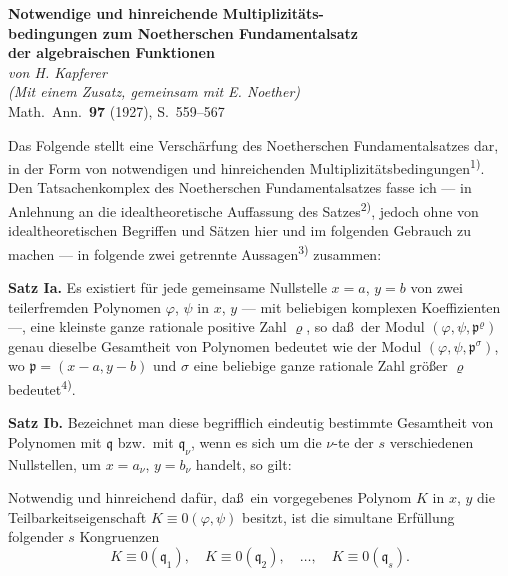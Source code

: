 \documentclass[12pt,a4paper]{article}
\theoremstyle{plain}
\theoremstyle{definition}
\theoremstyle{remark}
\begin{document}

\begin{center}
\Large\textbf{Notwendige und hinreichende Multiplizit\"ats-}\\[0.3em]
\Large\textbf{bedingungen zum Noetherschen Fundamentalsatz}\\[0.5em]
\large\textbf{der algebraischen Funktionen}\\[1em]
\normalsize\textit{von H. Kapferer}\\[0.5em]
\small\textit{(Mit einem Zusatz, gemeinsam mit E. Noether)}\\[1em]
\normalsize Math.\ Ann.\ \textbf{97} (1927), S.~559--567
\end{center}

\vspace{1em}

Das Folgende stellt eine Versch\"arfung des Noetherschen
Fundamentalsatzes dar, in der Form von notwendigen und
hinreichenden Multiplizit\"atsbedingungen\textsuperscript{1)}. Den
Tatsachenkomplex des Noetherschen Fundamentalsatzes fasse ich ---
in Anlehnung an die idealtheoretische Auffassung des
Satzes\textsuperscript{2)}, jedoch ohne von idealtheoretischen Begriffen und
S\"atzen hier und im folgenden Gebrauch zu machen --- in folgende
zwei getrennte Aussagen\textsuperscript{3)} zusammen:

\smallskip
\textbf{Satz Ia.} Es existiert f\"ur jede gemeinsame Nullstelle $x = a$,
$y = b$ von zwei teilerfremden Polynomen $\varphi$, $\psi$ in $x$, $y$ --- mit
beliebigen komplexen Koeffizienten ---, eine kleinste ganze rationale
positive Zahl $\varrho$, so da\ss\ der Modul $(\varphi, \psi, \mathfrak{p}^{\varrho})$
genau dieselbe Gesamtheit von Polynomen bedeutet wie der Modul
$(\varphi, \psi, \mathfrak{p}^{\sigma})$, wo $\mathfrak{p} = (x-a, y-b)$ und $\sigma$
eine beliebige ganze rationale Zahl gr\"o\ss er $\varrho$
bedeutet\textsuperscript{4)}.

\smallskip
\textbf{Satz Ib.} Bezeichnet man diese begrifflich eindeutig bestimmte
Gesamtheit von Polynomen mit $\mathfrak{q}$ bzw.\ mit $\mathfrak{q}_{\nu}$, wenn
es sich um die $\nu$-te der $s$ verschiedenen Nullstellen, um $x = a_{\nu}$,
$y = b_{\nu}$ handelt, so gilt:

Notwendig und hinreichend daf\"ur, da\ss\ ein vorgegebenes Polynom $K$
in $x$, $y$ die Teilbarkeitseigenschaft $K \equiv 0(\varphi, \psi)$ besitzt, ist
die simultane Erf\"ullung folgender $s$ Kongruenzen
\[
K \equiv 0(\mathfrak{q}_{1}), \quad K \equiv 0(\mathfrak{q}_{2}), \quad\ldots,\quad
K \equiv 0(\mathfrak{q}_{s}).
\]
\end{document}
